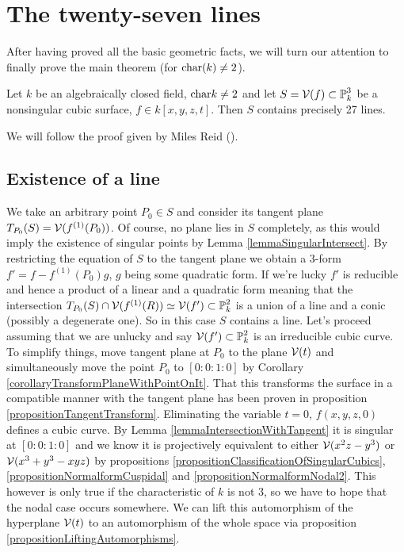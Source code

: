 \section{The twenty-seven lines}

After having proved all the basic geometric facts, we will turn our attention to finally prove the main theorem (for ${\operatorname{char}}(k) \neq 2$).
\begin{theorem}
Let $k$ be an algebraically closed field, ${\operatorname{char }} k \neq 2$ and let $S = \operatorname{\mathcal V}(f) \subset \operatorname{\mathbb P}^3_k$ be a nonsingular cubic surface, $f\in k[x,y,z,t]$.
Then $S$ contains precisely 27 lines.
\end{theorem}
We will follow the proof given by Miles Reid (\cite[§7]{reid1988undergraduate}).

\subsection{Existence of a line}

We take an arbitrary point $P_0 \in S$ and consider its tangent plane $T_{P_0}(S) = \operatorname{\mathcal V}(f^{(1)}(P_0))$.
Of course, no plane lies in $S$ completely, as this would imply the existence of singular points by Lemma \ref{lemmaSingularIntersect}.
By restricting the equation of $S$ to the tangent plane we obtain a 3-form $f' = f - f^{(1)}(P_0)g$, $g$ being some quadratic form.
If we're lucky $f'$ is reducible and hence a product of a linear and a quadratic form meaning that the intersection $T_{P_0}(S) \cap \operatorname{\mathcal V}(f^{(1)}(R)) \simeq \operatorname{\mathcal V}(f') \subset \operatorname{\mathbb P}^2_k$ is a union of a line and a conic (possibly a degenerate one).
So in this case $S$ contains a line.
Let's proceed assuming that we are unlucky and say $\operatorname{\mathcal V}(f') \subset \operatorname{\mathbb P}^2_k$ is an irreducible cubic curve.
To simplify things, move tangent plane at $P_0$ to the plane $\operatorname{\mathcal V}(t)$ and simultaneously move the point $P_0$ to $[0:0:1:0]$ by Corollary \ref{corollaryTransformPlaneWithPointOnIt}.
That this transforms the surface in a compatible manner with the tangent plane has been proven in proposition \ref{propositionTangentTransform}.
Eliminating the variable $t = 0$, $f(x,y,z,0)$ defines a cubic curve.
By Lemma \ref{lemmaIntersectionWithTangent} it is singular at $[0:0:1:0]$ and we know it is projectively equivalent to either $\operatorname{\mathcal V}(x^2z - y^3)$ or $\operatorname{\mathcal V}(x^3 + y^3 - xyz)$ by propositions \ref{propositionClassificationOfSingularCubics}, \ref{propositionNormalformCuspidal} and \ref{propositionNormalformNodal2}.
This however is only true if the characteristic of $k$ is not $3$, so we have to hope that the nodal case occurs somewhere.
We can lift this automorphism of the hyperplane $\operatorname{\mathcal V}(t)$ to an automorphism of the whole space via proposition \ref{propositionLiftingAutomorphisms}.

